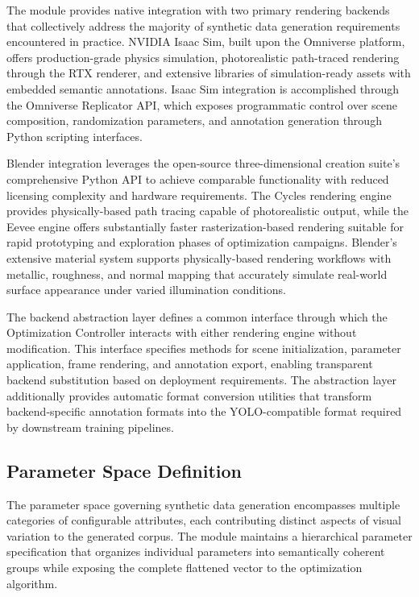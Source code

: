 The module provides native integration with two primary rendering backends that collectively address the majority of synthetic data generation requirements encountered in practice. NVIDIA Isaac Sim, built upon the Omniverse platform, offers production-grade physics simulation, photorealistic path-traced rendering through the RTX renderer, and extensive libraries of simulation-ready assets with embedded semantic annotations. Isaac Sim integration is accomplished through the Omniverse Replicator API, which exposes programmatic control over scene composition, randomization parameters, and annotation generation through Python scripting interfaces.

Blender integration leverages the open-source three-dimensional creation suite's comprehensive Python API to achieve comparable functionality with reduced licensing complexity and hardware requirements. The Cycles rendering engine provides physically-based path tracing capable of photorealistic output, while the Eevee engine offers substantially faster rasterization-based rendering suitable for rapid prototyping and exploration phases of optimization campaigns. Blender's extensive material system supports physically-based rendering workflows with metallic, roughness, and normal mapping that accurately simulate real-world surface appearance under varied illumination conditions.

The backend abstraction layer defines a common interface through which the Optimization Controller interacts with either rendering engine without modification. This interface specifies methods for scene initialization, parameter application, frame rendering, and annotation export, enabling transparent backend substitution based on deployment requirements. The abstraction layer additionally provides automatic format conversion utilities that transform backend-specific annotation formats into the YOLO-compatible format required by downstream training pipelines.

\subsection{Parameter Space Definition}

The parameter space governing synthetic data generation encompasses multiple categories of configurable attributes, each contributing distinct aspects of visual variation to the generated corpus. The module maintains a hierarchical parameter specification that organizes individual parameters into semantically coherent groups while exposing the complete flattened vector to the optimization algorithm.

